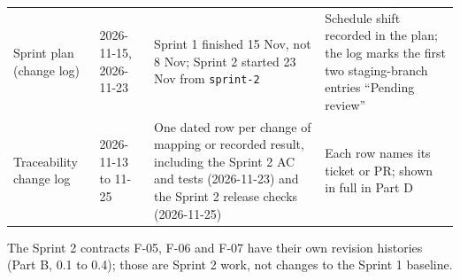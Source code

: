 {\begin{longtable}{@{}p{3.0cm}p{1.9cm}p{6.7cm}p{4.6cm}@{}}
Sprint plan (change log) & 2026-11-15, 2026-11-23 & Sprint 1 finished 15 Nov, not 8 Nov; Sprint 2 started 23 Nov from \texttt{sprint-2} & Schedule shift recorded in the plan; the log marks the first two staging-branch entries ``Pending review'' \\
Traceability change log & 2026-11-13 to 11-25 & One dated row per change of mapping or recorded result, including the Sprint 2 AC and tests (2026-11-23) and the Sprint 2 release checks (2026-11-25) & Each row names its ticket or PR; shown in full in Part D \\
\bottomrule
\end{longtable}}

\noindent The Sprint 2 contracts F-05, F-06 and F-07 have their own revision histories (Part B, 0.1 to 0.4); those are Sprint 2 work, not changes to the Sprint 1 baseline.
